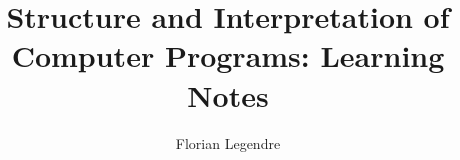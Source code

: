 \documentclass[a4paper]{report}
\begin{document}
\posttitle{\end{center}}

\title{Structure and Interpretation of Computer Programs: Learning Notes }
\author{Florian Legendre}

\maketitle{}
\tableofcontents



\newpage

\nocite{*}
\printbibliography
\end{document}
